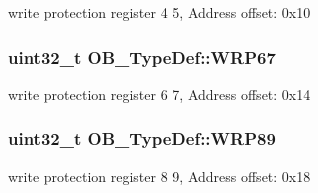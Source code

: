 write protection register 4 5, Address offset\-: 0x10 \hypertarget{struct_o_b___type_def_aeee96ac5e2dea75ccaec85ef502ec441}{
\subsubsection[{W\-R\-P67}]{ uint32\-\_\-t O\-B\-\_\-\-Type\-Def\-::\-W\-R\-P67}}\label{struct_o_b___type_def_aeee96ac5e2dea75ccaec85ef502ec441}
write protection register 6 7, Address offset\-: 0x14 \hypertarget{struct_o_b___type_def_a47af06105b059a6968c01b5c33e77f5c}{
\subsubsection[{W\-R\-P89}]{ uint32\-\_\-t O\-B\-\_\-\-Type\-Def\-::\-W\-R\-P89}}\label{struct_o_b___type_def_a47af06105b059a6968c01b5c33e77f5c}
write protection register 8 9, Address offset\-: 0x18 


